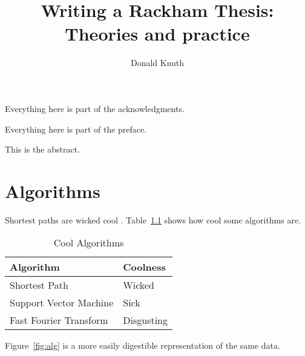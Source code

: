 \documentclass[doublespace]{rackham-thesis}
\begin{document}
\title{Writing a Rackham Thesis: Theories and practice}
\author{Donald Knuth}

\maketitle
\frontispiece{
  If you optimize everything, you will always be unhappy.\\[2\baselineskip]
	---Donald Knuth
}  %
\dedication{To Jill}  %
\acknowledgments %
Everything here is part of the acknowledgments.
\lipsum[1]

\preface %
Everything here is part of the preface.
\lipsum[1]

\tableofcontents  %
\listoffigures  %
\listoftables  %
\listofappendices  %
\abstract  %
This is the abstract.
\lipsum[1]

\chapter{Algorithms}

Shortest paths are wicked cool \parencite{dijkstra}.
Table~\ref{tab:alg} shows how cool some algorithms are.

\begin{table}[h]
    \centering
    \caption{Cool Algorithms}
    \begin{tabular}{ll} \toprule
        Algorithm & Coolness \\ \midrule
        Shortest Path & Wicked \\
        Support Vector Machine & Sick \\
        Fast Fourier Transform & Disgusting \\ \bottomrule
    \end{tabular}
    \label{tab:alg}
\end{table}

Figure~\ref{fig:alg} is a more easily digestible representation of the same data.
\end{document}
